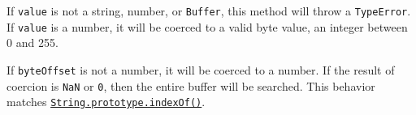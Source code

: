 \begin{Shaded}
\begin{Highlighting}[]
\NormalTok{(}\StringTok{\textquotesingle{}}\StringTok{\textquotesingle{}}\OperatorTok{,} \OperatorTok{,} \NormalTok{))}\OperatorTok{;}
\NormalTok{(}\StringTok{\textquotesingle{}}\StringTok{\textquotesingle{}}\OperatorTok{,} \OperatorTok{{-}}\OperatorTok{,} \NormalTok{))}\OperatorTok{;}
\end{Highlighting}
\end{Shaded}

If \texttt{value} is not a string, number, or \texttt{Buffer}, this
method will throw a \texttt{TypeError}. If \texttt{value} is a number,
it will be coerced to a valid byte value, an integer between 0 and 255.

If \texttt{byteOffset} is not a number, it will be coerced to a number.
If the result of coercion is \texttt{NaN} or \texttt{0}, then the entire
buffer will be searched. This behavior matches
\href{https://developer.mozilla.org/en-US/docs/Web/JavaScript/Reference/Global_Objects/String/indexOf}{\texttt{String.prototype.indexOf()}}.

